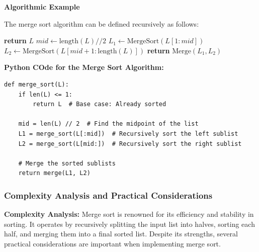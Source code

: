 \documentclass[12pt]{book} %
\begin{document}
\textbf{Algorithmic Example}

The merge sort algorithm can be defined recursively as follows:

\begin{algorithm}[H]
\caption{Merge Sort}
\begin{algorithmic}[1]
        \State \textbf{return} \( L \) 
    \EndIf
    \State \( mid \gets \text{length}(L) // 2 \) 
    \State \( L_1 \gets \text{MergeSort}(L[1 : mid]) \) 
    \State \( L_2 \gets \text{MergeSort}(L[mid + 1 : \text{length}(L)]) \) 
    \State \textbf{return} \( \text{Merge}(L_1, L_2) \) 
\EndProcedure
\end{algorithmic}
\end{algorithm}

\FloatBarrier
\textbf{Python COde for the Merge Sort Algorithm:}
\FloatBarrier
\begin{lstlisting}
def merge_sort(L):
    if len(L) <= 1:
        return L  # Base case: Already sorted
    
    mid = len(L) // 2  # Find the midpoint of the list
    L1 = merge_sort(L[:mid])  # Recursively sort the left sublist
    L2 = merge_sort(L[mid:])  # Recursively sort the right sublist

    # Merge the sorted sublists
    return merge(L1, L2)

\end{lstlisting}

\subsubsection{Complexity Analysis and Practical Considerations}

\textbf{Complexity Analysis:}
Merge sort is renowned for its efficiency and stability in sorting. It operates by recursively splitting the input list into halves, sorting each half, and merging them into a final sorted list. Despite its strengths, several practical considerations are important when implementing merge sort.
\end{document}

